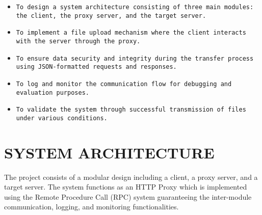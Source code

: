 \documentclass{article}
\begin{document}
\begin{itemize}
\RaggedRight
    \item \texttt{To design a system architecture consisting of three main modules: the client, the proxy server, and the target server.}
    \item \texttt{To implement a file upload mechanism where the client       interacts with the server through the proxy.}
    \item \texttt{To ensure data security and integrity during the transfer process using JSON-formatted requests and responses.}
    \item \texttt{To log and monitor the communication flow for debugging and evaluation purposes.}
    \item \texttt{To validate the system through successful transmission of files under various conditions.}
\end{itemize}



\section{SYSTEM ARCHITECTURE} %
The project consists of a modular design including a client, a proxy server, and a target server. The system functions as an HTTP Proxy which is implemented using the Remote Procedure Call (RPC) system guaranteeing the inter-module communication, logging, and monitoring functionalities.
\end{document}
